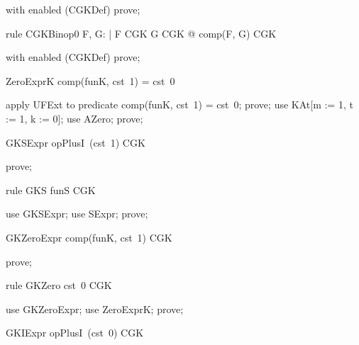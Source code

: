 \documentclass{article}
\begin{document}
\begin{zproof}
with enabled (CGKDef) prove;
\end{zproof}

\begin{theorem}{rule CGKBinop0}
  \forall F, G: \nat \fun \nat | F \in CGK \land G \in CGK @ comp(F, G) \in CGK
\end{theorem}

\begin{zproof}
with enabled (CGKDef) prove;
\end{zproof}


\begin{theorem}{ZeroExprK}
  comp(funK, cst~1) = cst~0
\end{theorem}

\begin{zproof}
apply UFExt to predicate comp(funK, cst~1) = cst~0;
prove;
use KAt[m := 1, t := 1, k := 0];
use AZero;
prove;
\end{zproof}

\begin{theorem}{GKSExpr}
  opPlusI~(cst~1) \in CGK
\end{theorem}

\begin{zproof}
prove;
\end{zproof}

\begin{theorem}{rule GKS}
  funS \in CGK
\end{theorem}

\begin{zproof}
use GKSExpr;
use SExpr;
prove;
\end{zproof}

\begin{theorem}{GKZeroExpr}
  comp(funK, cst~1) \in CGK
\end{theorem}

\begin{zproof}
prove;
\end{zproof}

\begin{theorem}{rule GKZero}
  cst~0 \in CGK
\end{theorem}

\begin{zproof}
use GKZeroExpr;
use ZeroExprK;
prove;
\end{zproof}

\begin{theorem}{GKIExpr}
  opPlusI~(cst~0) \in CGK
\end{theorem}
\end{document}
